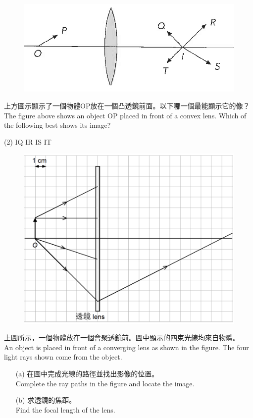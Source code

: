 \documentclass[beamer=true]{standalone}
\begin{document}
\begin{eg}
    \begin{figure}
        \centering
        \includegraphics[width=0.6\linewidth]{assets/9nd832d.png}


    \end{figure}
    上方圖示顯示了一個物體OP放在一個凸透鏡前面。以下哪一個最能顯示它的像？\\The figure above shows an object OP placed in front of a convex lens. Which of the following best shows its image?
    \begin{tasks}
        (2)
        \task IQ
        \task IR
        \task IS
        \task IT
    \end{tasks}
\end{eg}

\begin{eg}
    \begin{figure}
        \centering
        \includegraphics[width=0.75\linewidth]{assets/dewdn9u823.png}


    \end{figure}
\end{eg}

\begin{eg}
    上圖所示，一個物體放在一個會聚透鏡前。圖中顯示的四束光線均來自物體。\\An object is placed in front of a converging lens as shown in the figure. The four light rays shown come from the object.
    \begin{itemize}
        \item [(a)] 在圖中完成光線的路徑並找出影像的位置。\\Complete the ray paths in the figure and locate the image.
        \item [(b)] 求透鏡的焦距。\\Find the focal length of the lens.
    \end{itemize}

\end{eg}
\end{document}
